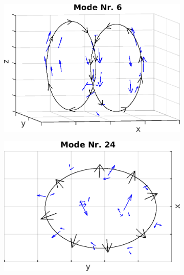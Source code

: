 \documentclass[numbers=noenddot,a4paper,notitlepage,twoside,BCOR15mm]{scrbook}
\begin{document}
							\begin{figure}[!t]
								\centering
								\begin{subfigure}[t]{0.325\textwidth}
									\centering
									\includegraphics[width=\textwidth,height=0.8\textwidth]{figs/auswertung/manipulation/quadrupol1HzModeNr6.png}
								\end{subfigure}
								\begin{subfigure}[t]{0.325\textwidth}
									\centering
									\includegraphics[width=\textwidth,height=0.8\textwidth]{figs/auswertung/manipulation/quadrupol1HzModeNr24.png}
								\end{subfigure}

\end{figure}
\end{document}
